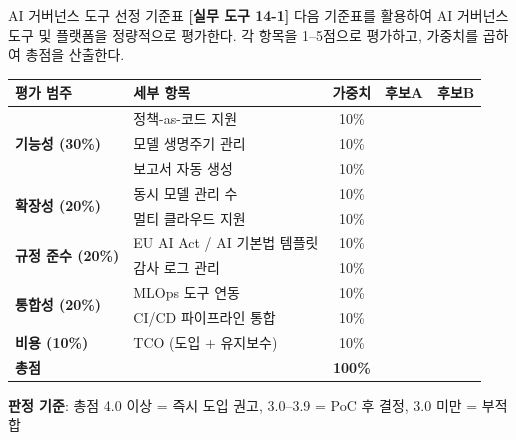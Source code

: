 \begin{practicaltool}{AI 거버넌스 도구 선정 기준표}
\textbf{[실무 도구 14-1]} 다음 기준표를 활용하여 AI 거버넌스 도구 및 플랫폼을 정량적으로 평가한다. 각 항목을 1--5점으로 평가하고, 가중치를 곱하여 총점을 산출한다.

\centering
\begin{tabularx}{\textwidth}{Xlccc}
\toprule
\textbf{평가 범주} & \textbf{세부 항목} & \textbf{가중치} & \textbf{후보A} & \textbf{후보B} \\
\midrule
\multirow{3}{*}{\textbf{기능성 (30\%)}}
 & 정책-as-코드 지원 & 10\% & & \\
 & 모델 생명주기 관리 & 10\% & & \\
 & 보고서 자동 생성 & 10\% & & \\
\midrule
\multirow{2}{*}{\textbf{확장성 (20\%)}}
 & 동시 모델 관리 수 & 10\% & & \\
 & 멀티 클라우드 지원 & 10\% & & \\
\midrule
\multirow{2}{*}{\textbf{규정 준수 (20\%)}}
 & EU AI Act / AI 기본법 템플릿 & 10\% & & \\
 & 감사 로그 관리 & 10\% & & \\
\midrule
\multirow{2}{*}{\textbf{통합성 (20\%)}}
 & MLOps 도구 연동 & 10\% & & \\
 & CI/CD 파이프라인 통합 & 10\% & & \\
\midrule
\textbf{비용 (10\%)}
 & TCO (도입 + 유지보수) & 10\% & & \\
\midrule
\multicolumn{2}{l}{\textbf{총점}} & \textbf{100\%} & & \\
\bottomrule
\end{tabularx}

\textbf{판정 기준}: 총점 4.0 이상 = 즉시 도입 권고, 3.0--3.9 = PoC 후 결정, 3.0 미만 = 부적합
\end{practicaltool}


